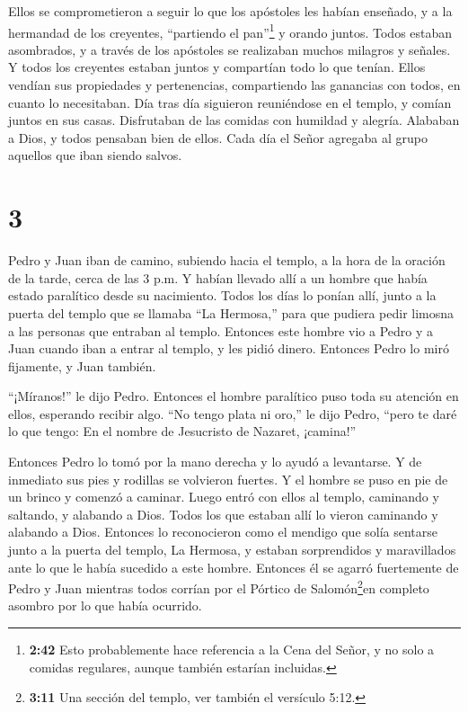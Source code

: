  Ellos se comprometieron a seguir lo que los apóstoles les
habían enseñado, y a la hermandad de los creyentes, ``partiendo el
pan''\footnote{\textbf{2:42} Esto probablemente hace referencia a la
  Cena del Señor, y no solo a comidas regulares, aunque también estarían
  incluidas.} y orando juntos.  Todos estaban asombrados, y
a través de los apóstoles se realizaban muchos milagros y señales.
 Y todos los creyentes estaban juntos y compartían todo lo
que tenían.  Ellos vendían sus propiedades y pertenencias,
compartiendo las ganancias con todos, en cuanto lo necesitaban.
 Día tras día siguieron reuniéndose en el templo, y comían
juntos en sus casas. Disfrutaban de las comidas con humildad y alegría.
Alababan a Dios, y todos pensaban bien de ellos.  Cada día
el Señor agregaba al grupo aquellos que iban siendo salvos.

\hypertarget{section-2}{%
\section{3}\label{section-2}}

 Pedro y Juan iban de camino, subiendo hacia el templo, a la
hora de la oración de la tarde, cerca de las 3 p.m.  Y
habían llevado allí a un hombre que había estado paralítico desde su
nacimiento. Todos los días lo ponían allí, junto a la puerta del templo
que se llamaba ``La Hermosa,'' para que pudiera pedir limosna a las
personas que entraban al templo.  Entonces este hombre vio a
Pedro y a Juan cuando iban a entrar al templo, y les pidió dinero.
 Entonces Pedro lo miró fijamente, y Juan también.

``¡Míranos!'' le dijo Pedro.  Entonces el hombre paralítico
puso toda su atención en ellos, esperando recibir algo. 
``No tengo plata ni oro,'' le dijo Pedro, ``pero te daré lo que tengo:
En el nombre de Jesucristo de Nazaret, ¡camina!''

 Entonces Pedro lo tomó por la mano derecha y lo ayudó a
levantarse. Y de inmediato sus pies y rodillas se volvieron fuertes.
 Y el hombre se puso en pie de un brinco y comenzó a
caminar. Luego entró con ellos al templo, caminando y saltando, y
alabando a Dios.  Todos los que estaban allí lo vieron
caminando y alabando a Dios.  Entonces lo reconocieron como
el mendigo que solía sentarse junto a la puerta del templo, La Hermosa,
y estaban sorprendidos y maravillados ante lo que le había sucedido a
este hombre.  Entonces él se agarró fuertemente de Pedro y
Juan mientras todos corrían por el Pórtico de Salomón\footnote{\textbf{3:11}
  Una sección del templo, ver también el versículo 5:12.}en completo
asombro por lo que había ocurrido.

